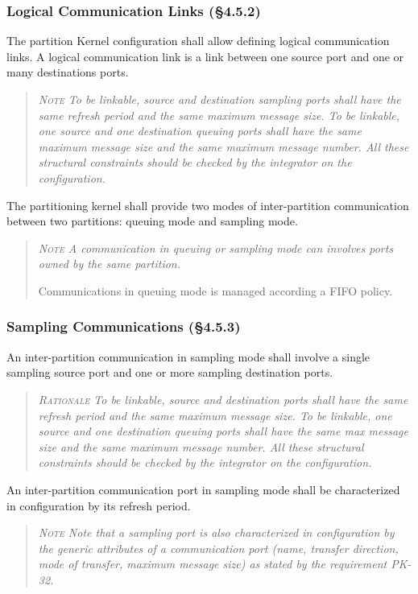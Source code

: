 \subsubsection{Logical Communication Links (\S4.5.2)}

The partition Kernel configuration shall allow defining logical communication links. A logical communication link is a link between one source port and one or many destinations ports.
\begin{quote}\it
\textsc{Note}
To be linkable, source and destination sampling ports shall have the same refresh period and the same maximum message size.  To be linkable, one source and one destination queuing ports shall have the same maximum message size and the same maximum message number. All these structural constraints should be checked by the integrator on the configuration.
\end{quote}

The partitioning kernel shall provide two modes of inter-partition communication between two partitions:  queuing mode and sampling mode.
\begin{quote}\it
\textsc{Note}
A communication in queuing or sampling mode can involves ports owned by the same partition.

Communications in queuing mode is managed according a FIFO policy.
\end{quote}

\subsubsection{Sampling Communications (\S4.5.3)}

An inter-partition communication in sampling mode shall involve a single sampling source port and one or more sampling destination ports.
\begin{quote}\it
\textsc{Rationale}
To be linkable, source and destination ports shall have the same refresh period and the same maximum message size.  To be linkable, one source and one destination queuing ports shall have the same max message size and the same maximum message number. All these structural constraints should be checked by the integrator on the configuration.
\end{quote}

An inter-partition communication port in sampling mode shall be characterized in configuration by its refresh period.
\begin{quote}\it
\textsc{Note}
Note that a sampling port is also characterized in configuration by the generic attributes of a communication port (name, transfer direction, mode of transfer, maximum message size)  as stated by the requirement PK-32.
\end{quote}

